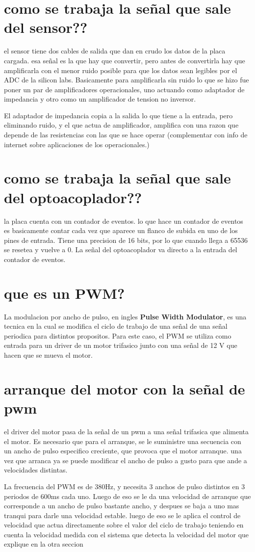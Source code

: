 \documentclass[a4paper]{article}
\begin{document}
\section*{como se trabaja la señal que sale del sensor??}
el sensor tiene dos cables de salida que dan en crudo los datos de la placa cargada. esa señal es la que hay que convertir, pero antes de convertirla hay que amplificarla con el menor ruido posible para que los datos sean legibles por el ADC de la silicon labs. Basicamente para amplificarla sin ruido lo que se hizo fue poner un par de amplificadores operacionales, uno actuando como adaptador de impedancia y otro como un amplificador de tension no inversor.

El adaptador de impedancia copia a la salida lo que tiene a la entrada, pero eliminando ruido, y el que actua de amplificador, amplifica con una razon que depende de las resistencias con las que se hace operar (complementar con info de internet sobre aplicaciones de los operacionales.)

\section*{como se trabaja la señal que sale del optoacoplador??}
la placa cuenta con un contador de eventos. lo que hace un contador de eventos es basicamente contar cada vez que aparece un flanco de subida en uno de los pines de entrada. Tiene una precision de 16 bits, por lo que cuando llega a 65536 se resetea y vuelve a 0. La señal del optoacoplador va directo a la entrada del contador de eventos.

\section*{que es un PWM?}
La modulacion por ancho de pulso, en ingles \textbf{Pulse Width Modulator}, es una tecnica en la cual se modifica el ciclo de trabajo de una señal de una señal periodica para distintos propositos. Para este caso, el PWM se utiliza como entrada para un driver de un motor trifasico junto con una señal de 12 V que hacen que se mueva el motor.

\section*{arranque del motor con la señal de pwm}
el driver del motor pasa de la señal de un pwm a una señal trifasica que alimenta el motor. Es necesario que para el arranque, se le suministre una secuencia con un ancho de pulso especifico creciente, que provoca que el motor arranque. una vez que arranca ya se puede modificar el ancho de pulso a gusto para que ande a velocidades distintas.

La frecuencia del PWM es de 380Hz, y necesita 3 anchos de pulso distintos en 3 periodos de 600ms cada uno. Luego de eso se le da una velocidad de arranque que corresponde a un ancho de pulso bastante ancho, y despues se baja a uno mas tranqui para darle una velocidad estable. luego de eso se le aplica el control de velocidad que actua directamente sobre el valor del ciclo de trabajo teniendo en cuenta la velocidad medida con el sistema que detecta la velocidad del motor que explique en la otra seccion
\end{document}
